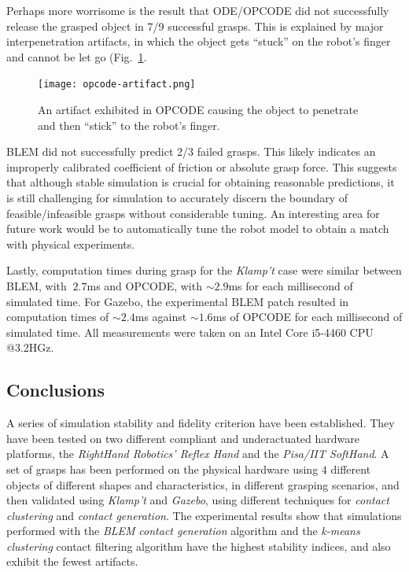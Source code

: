 Perhaps more worrisome is the result that ODE/OPCODE did not successfully release the grasped object in 7/9 successful grasps.  This is explained by major interpenetration artifacts, in which the object gets ``stuck'' on the robot's finger and cannot be let go (Fig.~\ref{fig:OPCODEArtifact}. 

\begin{figure}
    \centering
    \texttt{[image: opcode-artifact.png]}
    \caption{An artifact exhibited in OPCODE causing the object to penetrate and then ``stick'' to the robot's finger.}
    \label{fig:OPCODEArtifact}
\end{figure}

BLEM did not successfully predict 2/3 failed grasps. This likely indicates an improperly calibrated coefficient of friction or absolute grasp force.  This suggests that although stable simulation is crucial for obtaining reasonable predictions, it is still challenging for simulation to accurately discern the boundary of feasible/infeasible grasps without considerable tuning.   An interesting area for future work would be to automatically tune the robot model to obtain a match with physical experiments.

Lastly, computation times during grasp for the \emph{Klamp't} case were similar between BLEM, with $~2.7$ms and OPCODE, with $\sim2.9$ms for each millisecond of simulated time. For Gazebo, the experimental BLEM patch resulted in computation times of $\sim2.4$ms against $\sim1.6$ms of OPCODE for each millisecond of simulated time. All measurements were taken on an Intel Core i5-4460 CPU @3.2HGz.

\subsection{Conclusions}
A series of simulation stability and fidelity criterion have been established. They have been tested on two different compliant and underactuated hardware platforms, the \emph{RightHand Robotics' Reflex Hand} and the \emph{Pisa/IIT SoftHand}. A set of grasps has been performed on the physical hardware using $4$ different objects of different shapes and characteristics, in different grasping scenarios, and then validated using \emph{Klamp't} and \emph{Gazebo}, using different techniques for \emph{contact clustering} and \emph{contact generation}. The experimental results show that  simulations performed with the \emph{BLEM} \emph{contact generation} algorithm and the \emph{k-means clustering} contact filtering algorithm have the highest stability indices, and also exhibit the fewest artifacts.
